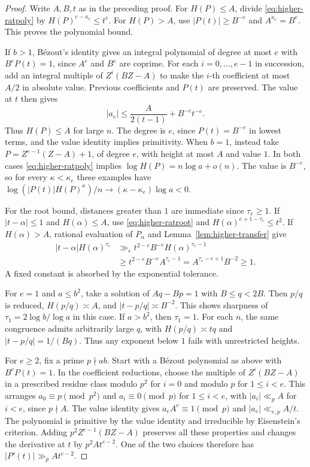 \documentclass[11pt,a4paper,reqno]{amsart}
\theoremstyle{definition}
\theoremstyle{remark}
\numberwithin{equation}{section}
\begin{document}
\begin{proof}
Write \(A,B,t\) as in the preceding proof. For \(H(P)\le A\),
divide \eqref{eq:higher-ratpoly} by
\(H(P)^{e-\kappa_e}\le t^e\). For \(H(P)>A\), use
\(|P(t)|\ge B^{-e}\) and \(A^{\kappa_e}=B^e\).
This proves the polynomial bound.

If \(b>1\), B\'ezout's identity gives an integral polynomial
of degree at most \(e\) with \(B^eP(t)=1\), since \(A^e\)
and \(B^e\) are coprime. For each \(i=0,\ldots,e-1\)
in succession, add an integral multiple of \(Z^i(BZ-A)\)
to make the \(i\)-th coefficient at most \(A/2\) in
absolute value. Previous coefficients and \(P(t)\) are
preserved. The value at \(t\) then gives
\[
   |a_e|\le \frac{A}{2(t-1)}+B^{-e}t^{-e}.
\]
Thus \(H(P)\le A\) for large \(n\). The degree is \(e\),
since \(P(t)=B^{-e}\) in lowest terms, and the value
identity implies primitivity. When \(b=1\), instead take
\(P=Z^{e-1}(Z-A)+1\), of degree \(e\), with height at most
\(A\) and value \(1\). In both cases
\eqref{eq:higher-ratpoly} implies
\(\log H(P)=n\log a+o(n)\). The value is \(B^{-e}\),
so for every \(\kappa<\kappa_e\) these examples have
\(\log(|P(t)|H(P)^\kappa)/n\to(\kappa-\kappa_e)\log a<0\).

For the root bound, distances greater than \(1\) are
immediate since \(\tau_e\ge1\). If \(|t-\alpha|\le1\)
and \(H(\alpha)\le A\), use \eqref{eq:higher-ratroot}
and \(H(\alpha)^{e+1-\tau_e}\le t^2\).
If \(H(\alpha)>A\), rational evaluation of \(P_\alpha\)
and Lemma~\ref{lem:higher-transfer} give
\begin{align*}
 |t-\alpha|H(\alpha)^{\tau_e}
 &\gg_e t^{2-e}B^{-e}H(\alpha)^{\tau_e-1}\\
 &\ge t^{2-e}B^{-e}A^{\tau_e-1}
   = A^{\tau_e-e+1}B^{-2}\ge1 .
\end{align*}
A fixed constant is absorbed by the exponential tolerance.

For \(e=1\) and \(a\le b^2\), take a solution of
\(Aq-Bp=1\) with \(B\le q<2B\). Then \(p/q\) is reduced,
\(H(p/q)\asymp A\), and \(|t-p/q|\asymp B^{-2}\).
This shows sharpness of \(\tau_1=2\log b/\log a\) in this
case. If \(a>b^2\), then \(\tau_1=1\). For each \(n\),
the same congruence admits arbitrarily large \(q\), with
\(H(p/q)\asymp t q\) and \(|t-p/q|=1/(Bq)\).
Thus any exponent below \(1\) fails with unrestricted
heights.

For \(e\ge2\), fix a prime \(p\nmid ab\).
Start with a B\'ezout polynomial as above with \(B^eP(t)=1\).
In the coefficient reductions, choose the multiple of
\(Z^i(BZ-A)\) in a prescribed residue class modulo \(p^2\)
for \(i=0\) and modulo \(p\) for \(1\le i<e\).
This arranges \(a_0\equiv p\pmod{p^2}\) and
\(a_i\equiv0\pmod p\) for \(1\le i<e\), with
\(|a_i|\ll_p A\) for \(i<e\), since \(p\nmid A\).
The value identity gives \(a_e A^e\equiv1\pmod p\) and
\(|a_e|\ll_{e,p} A/t\). The polynomial is primitive
by the value identity and irreducible by Eisenstein's
criterion. Adding \(p^2Z^{e-1}(BZ-A)\) preserves all
these properties and changes the derivative at \(t\)
by \(p^2 A t^{e-2}\). One of the two choices therefore
has \(|P'(t)|\gg_p A t^{e-2}\).


\end{proof}
\end{document}
